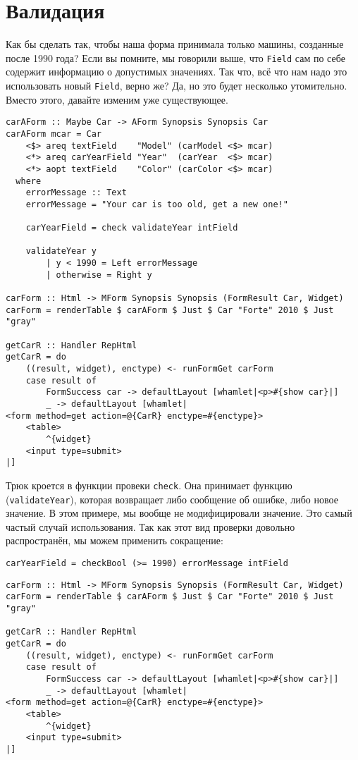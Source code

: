 \section{Валидация}
Как бы сделать так, чтобы наша форма принимала только машины, созданные после 1990 года?
Если вы помните, мы говорили выше, что \lstinline'Field' сам по себе содержит информацию 
о допустимых значениях. Так что, всё что нам надо это использовать новый
\lstinline'Field', верно же? Да, но это будет несколько утомительно. Вместо этого,
давайте изменим уже существующее.
\begin{lstlisting}
carAForm :: Maybe Car -> AForm Synopsis Synopsis Car
carAForm mcar = Car
    <$> areq textField    "Model" (carModel <$> mcar)
    <*> areq carYearField "Year"  (carYear  <$> mcar)
    <*> aopt textField    "Color" (carColor <$> mcar)
  where
    errorMessage :: Text
    errorMessage = "Your car is too old, get a new one!"

    carYearField = check validateYear intField

    validateYear y
        | y < 1990 = Left errorMessage
        | otherwise = Right y

carForm :: Html -> MForm Synopsis Synopsis (FormResult Car, Widget)
carForm = renderTable $ carAForm $ Just $ Car "Forte" 2010 $ Just "gray"

getCarR :: Handler RepHtml
getCarR = do
    ((result, widget), enctype) <- runFormGet carForm
    case result of
        FormSuccess car -> defaultLayout [whamlet|<p>#{show car}|]
        _ -> defaultLayout [whamlet|
<form method=get action=@{CarR} enctype=#{enctype}>
    <table>
        ^{widget}
    <input type=submit>
|]
\end{lstlisting}

Трюк кроется в функции провеки \lstinline'check'. Она принимает функцию 
(\lstinline'validateYear'), которая возвращает либо сообщение об ошибке, либо новое
значение. В этом примере, мы вообще не модифицировали значение. Это самый частый случай
использования. Так как этот вид проверки довольно распространён, мы можем применить
сокращение:

\begin{lstlisting}
carYearField = checkBool (>= 1990) errorMessage intField
\end{lstlisting}

\begin{lstlisting}
carForm :: Html -> MForm Synopsis Synopsis (FormResult Car, Widget)
carForm = renderTable $ carAForm $ Just $ Car "Forte" 2010 $ Just "gray"

getCarR :: Handler RepHtml
getCarR = do
    ((result, widget), enctype) <- runFormGet carForm
    case result of
        FormSuccess car -> defaultLayout [whamlet|<p>#{show car}|]
        _ -> defaultLayout [whamlet|
<form method=get action=@{CarR} enctype=#{enctype}>
    <table>
        ^{widget}
    <input type=submit>
|]
\end{lstlisting}

